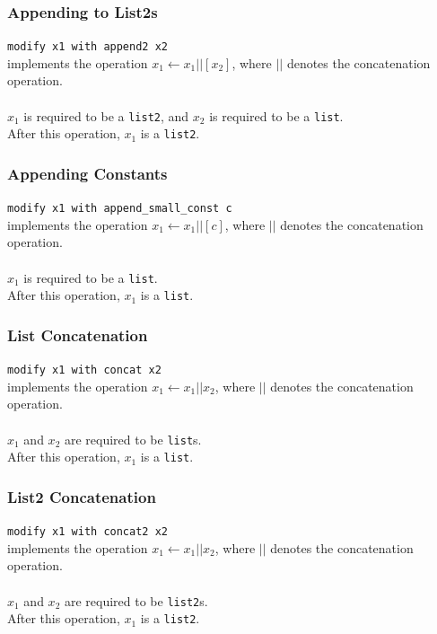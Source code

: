 \documentclass[11pt]{report}
\begin{document}
\subsubsection{Appending to List2s}

\texttt{modify x1 with append2 x2} \\
implements the operation $x_1 \leftarrow x_1 || [x_2]$, where $||$ denotes the concatenation operation. \\ \\
$x_1$ is required to be a \texttt{list2}, and $x_2$ is required to be a \texttt{list}. \\
After this operation, $x_1$ is a \texttt{list2}.

\subsubsection{Appending Constants}

\texttt{modify x1 with append\_small\_const c} \\
implements the operation $x_1 \leftarrow x_1 || [c]$, where $||$ denotes the concatenation operation. \\ \\
$x_1$ is required to be a \texttt{list}. \\
After this operation, $x_1$ is a \texttt{list}.

\subsubsection{List Concatenation}

\texttt{modify x1 with concat x2} \\
implements the operation $x_1 \leftarrow x_1 || x_2$, where $||$ denotes the concatenation operation. \\ \\
$x_1$ and $x_2$ are required to be \texttt{list}s. \\
After this operation, $x_1$ is a \texttt{list}.

\subsubsection{List2 Concatenation}

\texttt{modify x1 with concat2 x2} \\
implements the operation $x_1 \leftarrow x_1 || x_2$, where $||$ denotes the concatenation operation. \\ \\
$x_1$ and $x_2$ are required to be \texttt{list2}s. \\
After this operation, $x_1$ is a \texttt{list2}.
\end{document}
